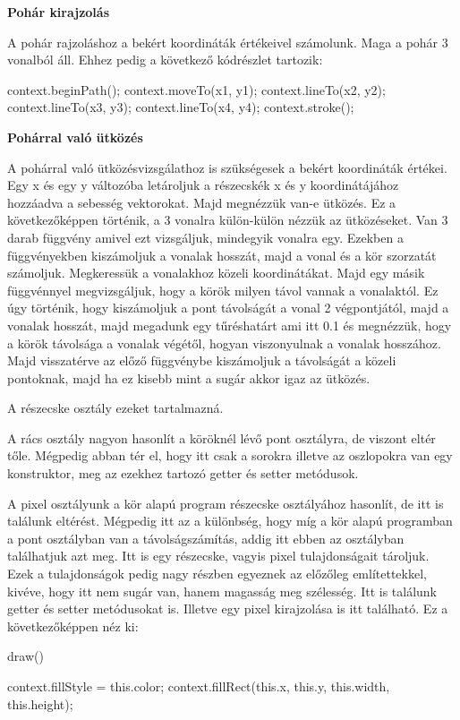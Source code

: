 \textbf{Pohár kirajzolás}

A pohár rajzoláshoz a bekért koordináták értékeivel számolunk. Maga a pohár 3 vonalból áll. Ehhez pedig a következő kódrészlet tartozik:
\begin{java}
	context.beginPath();
	context.moveTo(x1, y1);
	context.lineTo(x2, y2);
	context.lineTo(x3, y3);
	context.lineTo(x4, y4);
	context.stroke();
\end{java}


\textbf{Pohárral való ütközés}
\cite{collision}

A pohárral való ütközésvizsgálathoz is szükségesek a bekért koordináták értékei. Egy x és egy y változóba letároljuk a részecskék x és y koordinátájához hozzáadva a sebesség vektorokat. Majd megnézzük van-e ütközés. Ez a következőképpen történik, a 3 vonalra külön-külön nézzük az ütközéseket. Van 3 darab függvény amivel ezt vizsgáljuk, mindegyik vonalra egy. Ezekben a függvényekben kiszámoljuk a vonalak hosszát, majd a vonal és a kör szorzatát számoljuk. Megkeressük a vonalakhoz közeli koordinátákat. Majd egy másik függvénnyel megvizsgáljuk, hogy a körök milyen távol vannak a vonalaktól. Ez úgy történik, hogy kiszámoljuk a pont távolságát a vonal 2 végpontjától, majd a vonalak hosszát, majd megadunk egy tűréshatárt ami itt 0.1 és megnézzük, hogy a körök távolsága a vonalak végétől, hogyan viszonyulnak a vonalak hosszához. Majd visszatérve az előző függvénybe kiszámoljuk a távolságát a közeli pontoknak, majd ha ez kisebb mint a sugár akkor igaz az ütközés. 


A részecske osztály ezeket tartalmazná. 



A rács osztály nagyon hasonlít a köröknél lévő pont osztályra, de viszont eltér tőle. Mégpedig abban tér el, hogy itt csak a sorokra illetve az oszlopokra van egy konstruktor, meg az ezekhez tartozó getter és setter metódusok. 



A pixel osztályunk a kör alapú program részecske osztályához hasonlít, de itt is találunk eltérést. Mégpedig itt az a különbség, hogy míg a kör alapú programban a pont osztályban van a távolságszámítás, addig itt ebben az osztályban találhatjuk azt meg. Itt is egy részecske, vagyis pixel tulajdonságait tároljuk. Ezek a tulajdonságok pedig nagy részben egyeznek az előzőleg említettekkel, kivéve, hogy itt nem sugár van, hanem magasság meg szélesség. Itt is találunk getter és setter metódusokat is. Illetve egy pixel kirajzolása is itt található. Ez a következőképpen néz ki:
\begin{java}
	  draw()
	{
		
		context.fillStyle = this.color;
		context.fillRect(this.x, this.y,
		 this.width, this.height);
		
		
	}
\end{java} 

